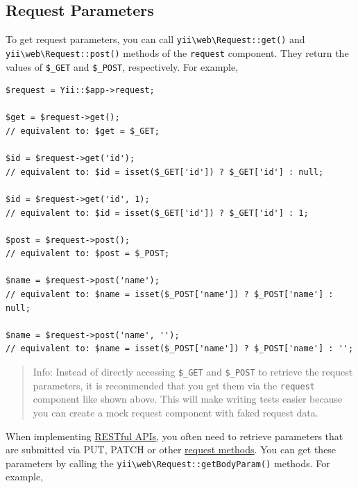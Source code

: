 \subsection{Request Parameters \label{runtime-requests.md::request-parameters}}
To get request parameters, you can call \texttt{yii{\allowbreak{}\textbackslash}web{\allowbreak{}\textbackslash}Request\allowbreak{}::\allowbreak{}get()} and \texttt{yii{\allowbreak{}\textbackslash}web{\allowbreak{}\textbackslash}Request\allowbreak{}::\allowbreak{}post()} methods
of the \lstinline|request| component. They return the values of \lstinline|$_GET| and \lstinline|$_POST|, respectively. For example,

\lstset{language=php}\begin{lstlisting}
$request = Yii::$app->request;

$get = $request->get(); 
// equivalent to: $get = $_GET;

$id = $request->get('id');   
// equivalent to: $id = isset($_GET['id']) ? $_GET['id'] : null;

$id = $request->get('id', 1);   
// equivalent to: $id = isset($_GET['id']) ? $_GET['id'] : 1;

$post = $request->post(); 
// equivalent to: $post = $_POST;

$name = $request->post('name');   
// equivalent to: $name = isset($_POST['name']) ? $_POST['name'] : null;

$name = $request->post('name', '');   
// equivalent to: $name = isset($_POST['name']) ? $_POST['name'] : '';
\end{lstlisting}
\begin{quote}Info: Instead of directly accessing \lstinline|$_GET| and \lstinline|$_POST| to retrieve the request parameters, it is recommended
  that you get them via the \lstinline|request| component like shown above. This will make writing tests easier because
  you can create a mock request component with faked request data.

\end{quote}
When implementing \hyperref[rest-quick-start.md]{RESTful APIs}, you often need to retrieve parameters that are submitted
via PUT, PATCH or other \hyperref[runtime-requests.md::::request-methods]{request methods}. You can get these parameters by calling
the \texttt{yii{\allowbreak{}\textbackslash}web{\allowbreak{}\textbackslash}Request\allowbreak{}::\allowbreak{}getBodyParam()} methods. For example,

